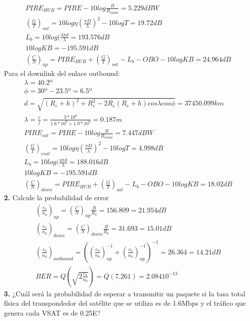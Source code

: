 \begin{exercise}[5]
\begin{gather*}
		PIRE_{HUB}=PIRE-10log\frac{B}{B_{canal}}=5.229dBW\\
		(\frac{G}{T})_{sat}=10log\eta(\frac{\pi D}{\lambda})^2-10logT=19.72dB\\
		L_b=10log(\frac{4\pi d}{\lambda}=193.576dB\\
		10logKB=-195.591dB\\
		(\frac{C}{N})_{up}=PIRE_{HUB}+(\frac{G}{T})_{sat}-L_b-OBO-10logKB=24.964dB
	\end{gather*}
	Para el downlink del enlace outbound:
	\begin{gather*}
		\lambda=40.2º\\
		\phi=30º-23.5º=6.5º\\
		d=\sqrt{(R_e+h)^2+R_e^2-2R_e(R_e+h)cos\lambda cos\phi}=37450.099km\\
		\lambda=\frac{c}{f}=\frac{3*10^8}{1.6*10^9+1.9*10^6}=0.187m\\
		PIRE_{sat}=PIRE-10log\frac{B}{B_{canal}}=7.447dBW\\
		(\frac{G}{T})_{vsat}=10log\eta(\frac{\pi D}{\lambda})^2-10logT=4.998dB\\
		L_b=10log(\frac{4\pi d}{\lambda}=188.016dB\\
		10logKB=-195.591dB\\
		(\frac{C}{N})_{down}=PIRE_{HUB}+(\frac{G}{T})_{sat}-L_b-OBO-10logKB=18.02dB
	\end{gather*}
	\textbf{2.} Calcule la probabilidad de error\\
	\begin{gather*}
		(\frac{e_b}{n_0})_{up}=(\frac{C}{N})_{up}\frac{B}{R_b}=156.809=21.954dB\\
		(\frac{e_b}{n_0})_{down}=(\frac{C}{N})_{down}\frac{B}{R_b}=31.693=15.01dB\\
		(\frac{e_b}{n_0})_{outbound}=((\frac{e_b}{n_0})_{up}^{-1}+(\frac{e_b}{n_0})_{up}^{-1})^{-1}=26.364=14.21dB\\
		BER=Q(\sqrt{2\frac{e_b}{n_0}})=Q(7.261)=2.08410^{-13}
	\end{gather*}
	\textbf{3.} ¿Cuál será la probabilidad de esperar a transmitir un paquete si la tasa total física del transpondedor del satélite que se utiliza es de 1.6Mbps y el tráfico que genera cada VSAT es de 0.25E? 
\end{exercise}
